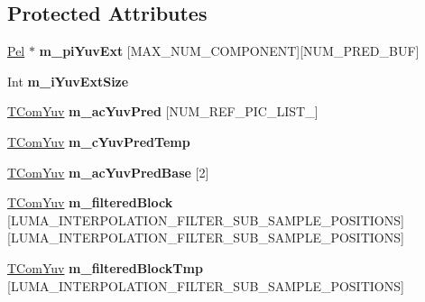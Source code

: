 \subsection*{Protected Attributes}
\begin{DoxyCompactItemize}
\item 
\mbox{\label{class_t_com_prediction_a85b0d7ab30241360da93a247a8f12c51}} 
\hyperlink{_type_def_8h_af92141699657699b4b547be0c8517541}{Pel} $\ast$ {\bfseries m\+\_\+pi\+Yuv\+Ext} \mbox{[}M\+A\+X\+\_\+\+N\+U\+M\+\_\+\+C\+O\+M\+P\+O\+N\+E\+NT\mbox{]}\mbox{[}N\+U\+M\+\_\+\+P\+R\+E\+D\+\_\+\+B\+UF\mbox{]}
\item 
\mbox{\label{class_t_com_prediction_a8fa1bc346a0d23e8745d4b4a57fa35a0}} 
Int {\bfseries m\+\_\+i\+Yuv\+Ext\+Size}
\item 
\mbox{\label{class_t_com_prediction_a35c79c38bb41850cf32758afc13b3ea9}} 
\hyperlink{class_t_com_yuv}{T\+Com\+Yuv} {\bfseries m\+\_\+ac\+Yuv\+Pred} \mbox{[}N\+U\+M\+\_\+\+R\+E\+F\+\_\+\+P\+I\+C\+\_\+\+L\+I\+S\+T\+\_\mbox{]}
\item 
\mbox{\label{class_t_com_prediction_aee1368ba40a14d9e38adf92f05513e89}} 
\hyperlink{class_t_com_yuv}{T\+Com\+Yuv} {\bfseries m\+\_\+c\+Yuv\+Pred\+Temp}
\item 
\mbox{\label{class_t_com_prediction_a234e454cfdce74d4fa5fc1b8dd248f48}} 
\hyperlink{class_t_com_yuv}{T\+Com\+Yuv} {\bfseries m\+\_\+ac\+Yuv\+Pred\+Base} \mbox{[}2\mbox{]}
\item 
\mbox{\label{class_t_com_prediction_a3fcc3c7e22282e32f488b3c309fc6b1c}} 
\hyperlink{class_t_com_yuv}{T\+Com\+Yuv} {\bfseries m\+\_\+filtered\+Block} \mbox{[}L\+U\+M\+A\+\_\+\+I\+N\+T\+E\+R\+P\+O\+L\+A\+T\+I\+O\+N\+\_\+\+F\+I\+L\+T\+E\+R\+\_\+\+S\+U\+B\+\_\+\+S\+A\+M\+P\+L\+E\+\_\+\+P\+O\+S\+I\+T\+I\+O\+NS\mbox{]}\mbox{[}L\+U\+M\+A\+\_\+\+I\+N\+T\+E\+R\+P\+O\+L\+A\+T\+I\+O\+N\+\_\+\+F\+I\+L\+T\+E\+R\+\_\+\+S\+U\+B\+\_\+\+S\+A\+M\+P\+L\+E\+\_\+\+P\+O\+S\+I\+T\+I\+O\+NS\mbox{]}
\item 
\mbox{\label{class_t_com_prediction_a6b66291a117ac1e801f2145d90510e28}} 
\hyperlink{class_t_com_yuv}{T\+Com\+Yuv} {\bfseries m\+\_\+filtered\+Block\+Tmp} \mbox{[}L\+U\+M\+A\+\_\+\+I\+N\+T\+E\+R\+P\+O\+L\+A\+T\+I\+O\+N\+\_\+\+F\+I\+L\+T\+E\+R\+\_\+\+S\+U\+B\+\_\+\+S\+A\+M\+P\+L\+E\+\_\+\+P\+O\+S\+I\+T\+I\+O\+NS\mbox{]}

\end{DoxyCompactItemize}
